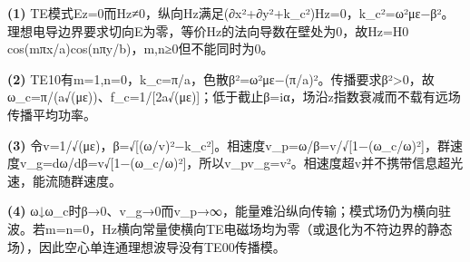 \par\noindent\textbf{(1)} TE模式Ez=0而Hz≠0，纵向Hz满足(∂x²+∂y²+k\_c²)Hz=0，k\_c²=ω²με−β²。理想电导边界要求切向E为零，等价Hz的法向导数在壁处为0，故Hz=H0 cos(mπx/a)cos(nπy/b)，m,n≥0但不能同时为0。
\par\noindent\textbf{(2)} TE10有m=1,n=0，k\_c=π/a，色散β²=ω²με−(π/a)²。传播要求β²>0，故ω\_c=π/(a√(με))、f\_c=1/[2a√(με)]；低于截止β=iα，场沿z指数衰减而不载有远场传播平均功率。
\par\noindent\textbf{(3)} 令v=1/√(με)，β=√[(ω/v)²−k\_c²]。相速度v\_p=ω/β=v/√[1−(ω\_c/ω)²]，群速度v\_g=dω/dβ=v√[1−(ω\_c/ω)²]，所以v\_pv\_g=v²。相速度超v并不携带信息超光速，能流随群速度。
\par\noindent\textbf{(4)} ω↓ω\_c时β→0、v\_g→0而v\_p→∞，能量难沿纵向传输；模式场仍为横向驻波。若m=n=0，Hz横向常量使横向TE电磁场均为零（或退化为不符边界的静态场），因此空心单连通理想波导没有TE00传播模。
